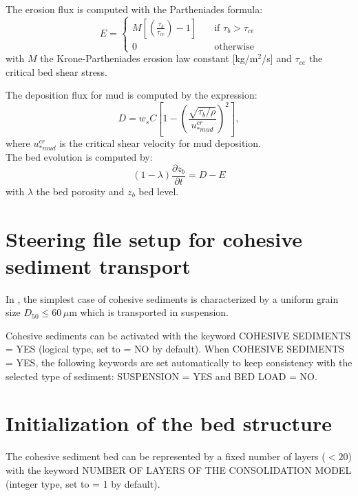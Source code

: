 The erosion flux is computed with the Partheniades formula:
\begin{equation*}
E = \left\{\begin{array}{ll}
M\left[\left(\frac{\tau_b}{\tau_{ce}}\right)-1\right]\quad & \text{if}\,\,\tau_b> \tau_{ce}\\  
0\quad & \text{otherwise}
\end{array}
\right. 
\end{equation*}
with $M$ the Krone-Partheniades erosion law constant [kg/m$^2$/s] and $\tau_{ce}$ the critical bed shear stress.

The deposition flux for mud is computed by the expression:
\begin{equation}
D = w_{s} C \left[1-\left(\frac{\sqrt{\tau_b/\rho}}{u_{*mud}^{cr}}\right)^2 \right],
\end{equation}
where $u_{*mud}^{cr}$ is the critical shear velocity for mud deposition.\\

The bed evolution is computed by:
\begin{equation*}
(1-\lambda)\frac{\partial z_b}{\partial t} = D - E
\end{equation*}
with $\lambda$ the bed porosity and $z_b$ bed level.

\section{Steering file setup for cohesive sediment transport}
In \sisyphe{}, the simplest case of cohesive sediments
is characterized by a uniform grain size $D_{50}\leq 60\,\mu$m which is
transported in suspension.

Cohesive sediments can be activated with the keyword {\ttfamily COHESIVE SEDIMENTS = YES} (logical type, set to {\ttfamily = NO} by default). When {\ttfamily COHESIVE SEDIMENTS = YES}, the following keywords are set automatically to keep consistency with the selected type of sediment: {\ttfamily SUSPENSION = YES} and {\ttfamily BED LOAD = NO}.


\section{Initialization of the bed structure}
The cohesive sediment bed can be represented by a fixed number of layers ($<20$) with the keyword {\ttfamily NUMBER OF LAYERS OF THE CONSOLIDATION MODEL} (integer type, set to {\ttfamily = 1} by default).

